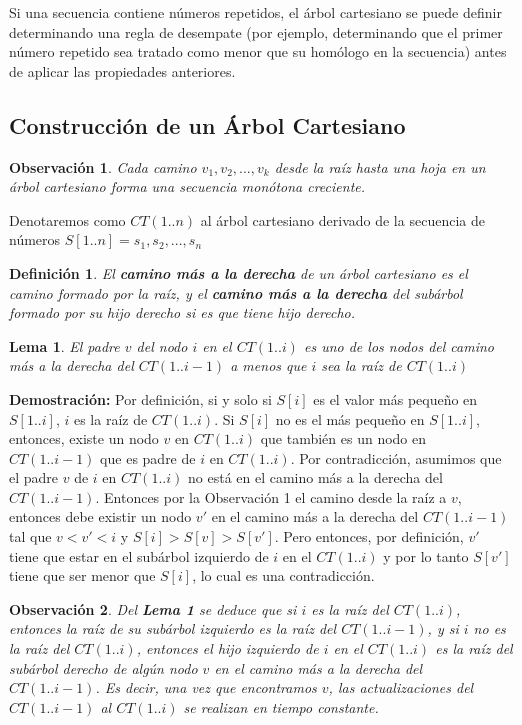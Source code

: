 \documentclass[12pt]{article}
\newcommand{\proof}{\textbf{Demostración:} }
\newcommand{\nl}{\vspace{0.3cm}}
\newcommand{\ct}{árbol cartesiano }
\newcommand{\rmp}{camino más a la derecha }
\newtheorem{lemma}{Lema}
\newtheorem{definition}{Definición}
\newtheorem{observation}{Observación}
\begin{document}
Si una secuencia contiene números repetidos, el \ct se puede definir determinando una regla de desempate (por ejemplo, determinando que el primer número repetido sea tratado como menor que su homólogo en la secuencia) antes de aplicar las propiedades anteriores.

\subsection{Construcción de un Árbol Cartesiano}

\nl

\begin{observation}
	Cada camino $v_1, v_2, ... , v_k$ desde la raíz hasta una hoja en un \ct forma una secuencia monótona creciente.
\end{observation}

Denotaremos como $CT(1..n)$ al \ct derivado de la secuencia de números $S[1..n] = s_1, s_2, ... , s_n$

\begin{definition}
	El \textbf{\rmp}de un \ct es el camino formado por la raíz, y el \textbf{\rmp}del subárbol formado por su hijo derecho si es que tiene hijo derecho.
\end{definition}

\begin{lemma}
	El padre $v$ del nodo $i$ en el $CT(1..i)$ es uno de los nodos del \rmp del $CT(1..i-1)$ a menos que $i$ sea la raíz de $CT(1..i)$
\end{lemma}

\newpage

\proof Por definición, si y solo si $S[i]$ es el valor más pequeño en $S[1..i]$, $i$ es la raíz de $CT(1..i)$. Si $S[i]$ no es el más pequeño en $S[1..i]$, entonces, existe un nodo $v$ en $CT(1..i)$ que también es un nodo en $CT(1..i-1)$ que es padre de $i$ en $CT(1..i)$. Por contradicción, asumimos que el padre $v$ de $i$ en $CT(1..i)$ no está en el \rmp del $CT(1..i-1)$. Entonces por la Observación 1 el camino desde la raíz a $v$, entonces debe existir un nodo $v'$ en el \rmp del $CT(1..i-1)$ tal que $v < v' < i$ y $S[i] > S[v] > S[v']$. Pero entonces, por definición, $v'$ tiene que estar en el subárbol izquierdo de $i$ en el $CT(1..i)$ y por lo tanto $S[v']$ tiene que ser menor que $S[i]$, lo cual es una contradicción.

\begin{observation}
	Del \textbf{Lema 1} se deduce que si $i$ es la raíz del $CT(1..i)$, entonces la raíz de su subárbol izquierdo es la raíz del $CT(1..i-1)$, y si $i$ no es la raíz del $CT(1..i)$, entonces el hijo izquierdo de $i$ en el $CT(1..i)$ es la raíz del subárbol derecho de algún nodo $v$ en el \rmp del $CT(1..i-1)$. Es decir, una vez que encontramos $v$, las actualizaciones del $CT(1..i-1)$ al $CT(1..i)$ se realizan en tiempo constante.
\end{observation}
\end{document}

